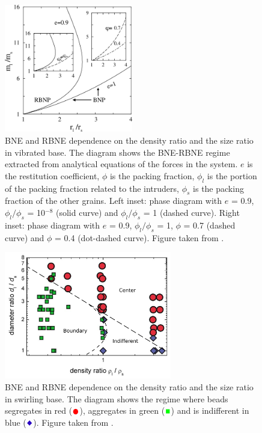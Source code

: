 \begin{figure}[H]
    \centering
    \includegraphics[width=0.5\textwidth]{04-figuras/BNE_Trujillo.png}
    \caption[Phase diagram of BNE/RBNE from analytics: density ratio and size ratio.]{BNE and RBNE dependence on the density ratio and the size ratio in vibrated base. The diagram shows the BNE-RBNE regime extracted from analytical equations of the forces in the system. $e$ is the restitution coefficient, $\phi$ is the packing fraction, $\phi_{l}$ is the portion of the packing fraction related to the intruders, $\phi_{s}$ is the packing fraction of the other grains. Left inset: phase diagram with $e$ = 0.9, $\phi_{l} / \phi_{s}$ = 10$^{-8}$ (solid curve) and $\phi_{l} / \phi_{s}$ = 1 (dashed curve). Right inset: phase diagram with $e$ = 0.9, $\phi_{l} / \phi_{s}$ = 1, $\phi$ = 0.7 (dashed curve) and $\phi$ = 0.4 (dot-dashed curve). Figure taken from \cite{Segregation_in_a_fluidized_binary_granular_mixture_Competition_between_buoyancy_and_geometric_forces}.}
    \label{fig:RBNE_trujillo}
\end{figure}

\begin{figure}[H]
    \centering
    \includegraphics[width=0.65\textwidth]{04-figuras/BNE_Schnautz.png}
    \caption[Phase diagram of BNE/RBNE in swirling: density ratio and size ratio.]{BNE and RBNE dependence on the density ratio and the size ratio in swirling base. The diagram shows the regime where beads segregates in red ($\textcolor{red}{\CIRCLE}$), aggregates in green ($\textcolor{green}{\blacksquare}$) and is indifferent in blue ($\textcolor{blue}{\Diamondblack}$). Figure taken from \cite{A_Horizontal_Brazil-Nut_Effect_and_Its_Reverse}.}
    \label{fig:RBNE_schnautz}
\end{figure}

